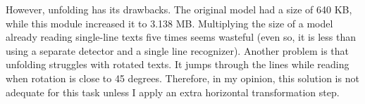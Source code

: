 However, unfolding has its drawbacks. The original model had a size of 640 KB, while this module increased it to 3.138 MB. Multiplying the size of a model already reading single-line texts five times seems wasteful (even so, it is less than using a separate detector and a single line recognizer). Another problem is that unfolding struggles with rotated texts. It jumps through the lines while reading when rotation is close to 45 degrees. Therefore, in my opinion, this solution is not adequate for this task unless I apply an extra horizontal transformation step.
